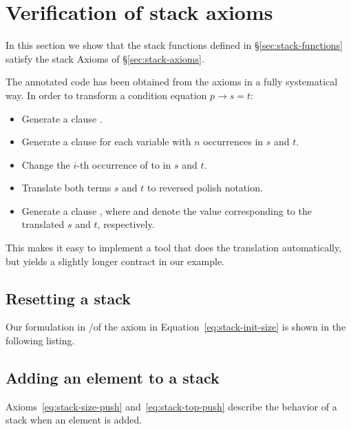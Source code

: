 
\section{Verification of stack axioms}

In this section we show that the stack functions defined in
\S\ref{sec:stack-functions}
satisfy the stack Axioms of \S\ref{sec:stack-axioms}.

The annotated code has been obtained from the axioms in a fully systematical way.
In order to transform a condition equation $p \rightarrow s = t$:
\begin{itemize}
\item Generate a clause .
\item Generate a clause  
for each variable  with $n$ occurrences 
in $s$ and $t$.
\item Change the $i$-th occurrence of  to  
in $s$ and $t$.
\item Translate both terms $s$ and $t$ to reversed polish notation.
\item Generate a clause , where  and
 denote the value corresponding to 
the translated $s$ and $t$, respectively.
\end{itemize}

This makes it easy to implement a tool that does the translation automatically,
but yields a slightly longer contract in our example.


\subsection{Resetting a stack}


Our formulation in \acsl\slash\isoc  of the axiom in
Equation~\eqref{eq:stack-init-size} is shown in  the following
listing.



\clearpage

\subsection{Adding an element to a stack}

Axioms~\eqref{eq:stack-size-push} and~\eqref{eq:stack-top-push}
describe the behavior of a stack when an element is added.

